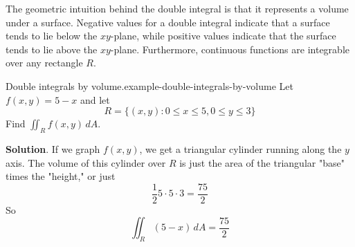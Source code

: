 \documentclass[10pt,]{book}
\numberwithin{equation}{section}
\begin{document}
\hypertarget{p-1460}{}%
The geometric intuition behind the double integral is that it represents a volume under a surface. Negative values for a double integral indicate that a surface tends to lie below the \(xy\)-plane, while positive values indicate that the surface tends to lie above the \(xy\)-plane. Furthermore, continuous functions are integrable over any rectangle \(R\).%
\begin{example}{Double integrals by volume.}{example-double-integrals-by-volume}%
\hypertarget{p-1461}{}%
Let \(f(x,y) = 5 - x\) and let%
\begin{equation*}
R = \{(x,y) : 0\leq x\leq 5, 0\leq y\leq 3\}
\end{equation*}
Find \(\iint_{R}f(x,y)\,dA\).%
\par\smallskip%
\noindent\textbf{Solution}.\hypertarget{solution-238}{}\quad%
\hypertarget{p-1462}{}%
If we graph \(f(x,y)\), we get a triangular cylinder running along the \(y\) axis. The volume of this cylinder over \(R\) is just the area of the triangular "base" times the "height," or just%
\begin{equation*}
\frac{1}{2}5\cdot5\cdot3 = \frac{75}{2}
\end{equation*}
So%
\begin{equation*}
\iint_{R}(5-x)\,dA = \frac{75}{2}
\end{equation*}
%
\end{example}
%
%
\typeout{************************************************}
\typeout{************************************************}
%
\end{document}
